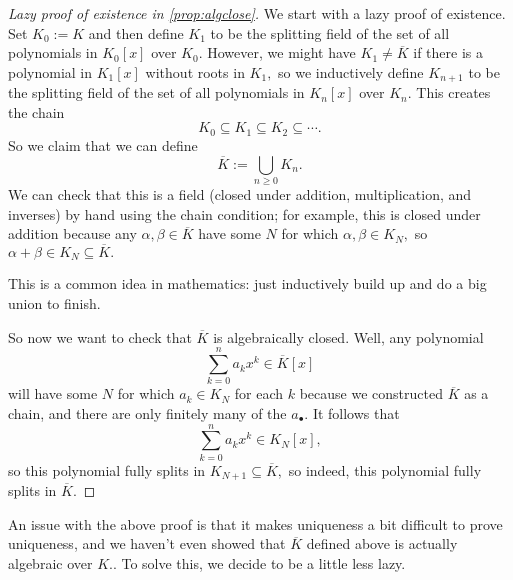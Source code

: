 \begin{proof}[Lazy proof of existence in \autoref{prop:algclose}]
	We start with a lazy proof of existence. Set $K_0:=K$ and then define $K_1$ to be the splitting field of the set of all polynomials in $K_0[x]$ over $K_0.$ However, we might have $K_1\ne\overline K$ if there is a polynomial in $K_1[x]$ without roots in $K_1,$ so we inductively define $K_{n+1}$ to be the splitting field of the set of all polynomials in $K_n[x]$ over $K_n.$ This creates the chain
	\[K_0\subseteq K_1\subseteq K_2\subseteq\cdots.\]
	So we claim that we can define
	\[\overline K:=\bigcup_{n\ge0}K_n.\]
	We can check that this is a field (closed under addition, multiplication, and inverses) by hand using the chain condition; for example, this is closed under addition because any $\alpha,\beta\in\overline K$ have some $N$ for which $\alpha,\beta\in K_N,$ so $\alpha+\beta\in K_N\subseteq\overline K.$
	\begin{remark}
		This is a common idea in mathematics: just inductively build up and do a big union to finish.
	\end{remark}
	So now we want to check that $\overline K$ is algebraically closed. Well, any polynomial
	\[\sum_{k=0}^na_kx^k\in\overline K[x]\]
	will have some $N$ for which $a_k\in K_N$ for each $k$ because we constructed $\overline K$ as a chain, and there are only finitely many of the $a_\bullet.$ It follows that
	\[\sum_{k=0}^na_kx^k\in K_N[x],\]
	so this polynomial fully splits in $K_{N+1}\subseteq\overline K,$ so indeed, this polynomial fully splits in $\overline K.$
\end{proof}
An issue with the above proof is that it makes uniqueness a bit difficult to prove uniqueness, and we haven't even showed that $\overline K$ defined above is actually algebraic over $K.$. To solve this, we decide to be a little less lazy.
